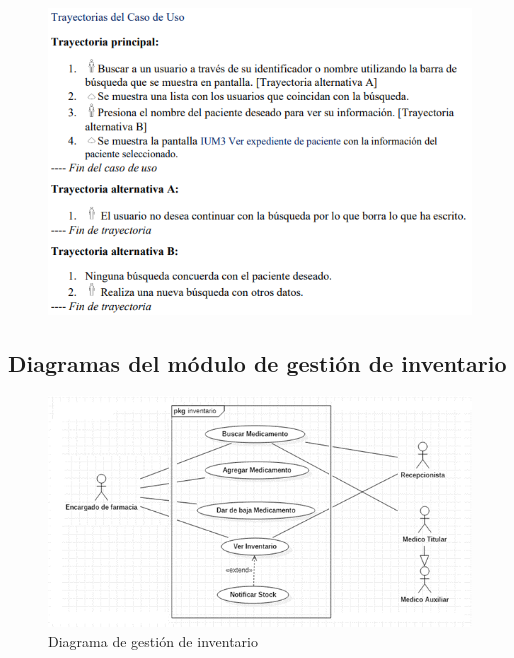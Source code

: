 \documentclass[12pt,letterpaper]{article}
\begin{document}
            \begin{figure}[H]
                \centering
                \includegraphics [scale=0.9]{specs/trayVerPaciente}
            \end{figure}
        
            \newpage
        \subsection{Diagramas del módulo de gestión de inventario}
            \begin{figure}[H]
                \centering
                \includegraphics [scale=0.8]{casosUso/gestionInventario}
                \caption{Diagrama de gestión de inventario}
            \end{figure}
\end{document}
